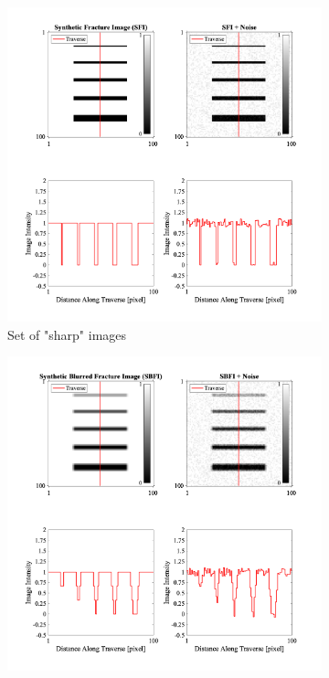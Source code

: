 \documentclass{edger}
\begin{document}
\begin{figure}[!h]
\centering
    \begin{subfigure}[b]{0.5\textwidth}            
            \includegraphics[width=\textwidth]{3DSyntheticFractureImages.png}
            \caption{Set of "sharp" images}
            \label{fig:Sharp images}
    \end{subfigure}%
    \begin{subfigure}[b]{0.5\textwidth}
            \centering
            \includegraphics[width=\textwidth]{3DSyntheticBlurredFractureImages.png}

\end{subfigure}
\end{figure}
\end{document}
